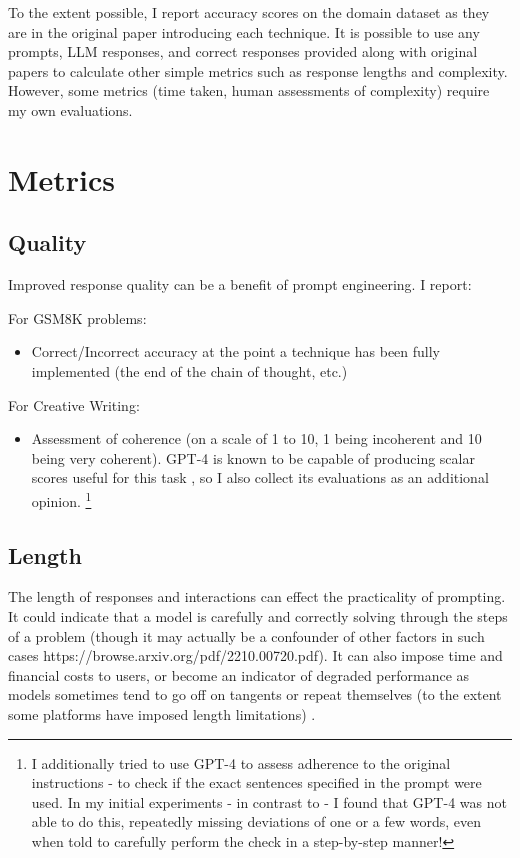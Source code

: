 \documentclass[11pt]{article}
\begin{document}
To the extent possible, I report accuracy scores on the domain dataset as they are in the original paper introducing each technique. It is possible to use any prompts, LLM responses, and correct responses provided along with original papers to calculate other simple metrics such as response lengths and complexity. However, some metrics (time taken, human assessments of complexity) require my own evaluations.

\section*{Metrics}

\subsection*{Quality}

Improved response quality can be a benefit of prompt engineering. I report:

For GSM8K problems:
\begin{itemize}
  \item Correct/Incorrect accuracy at the point a technique has been fully implemented (the end of the chain of thought, etc.)
\end{itemize}

For Creative Writing:
\begin{itemize}
  \item Assessment of coherence (on a scale of 1 to 10, 1 being incoherent and 10 being very coherent). GPT-4 is known to be capable of producing scalar scores useful for this task \cite{yao_tree_2023}, so I also collect its evaluations as an additional opinion. \footnote{I additionally tried to use GPT-4 to assess adherence to the original instructions - to check if the exact sentences specified in the prompt were used. In my initial experiments - in contrast to \citealp{yao_tree_2023} - I found that GPT-4 was not able to do this, repeatedly missing deviations of one or a few words, even when told to carefully perform the check in a step-by-step manner!}
\end{itemize}

\subsection*{Length}

The length of responses and interactions can effect the practicality of prompting. It could indicate that a model is carefully and correctly solving through the steps of a problem (though it may actually be a confounder of other factors in such cases https://browse.arxiv.org/pdf/2210.00720.pdf). It can also impose time and financial costs to users, or become an indicator of degraded performance as models sometimes tend to go off on tangents or repeat themselves (to the extent some platforms have imposed length limitations) \cite{mann_microsoft_nodate}. 
\end{document}
